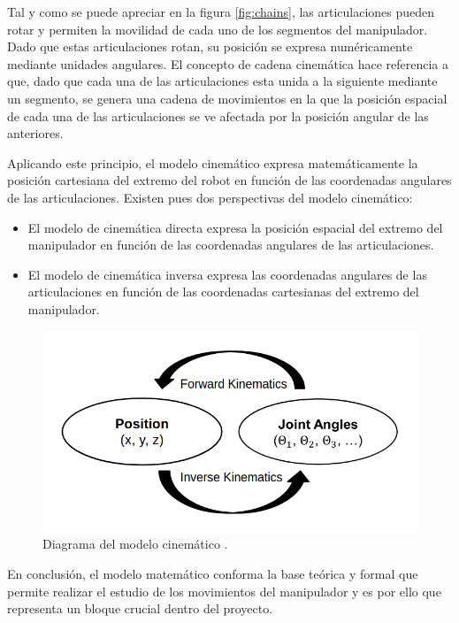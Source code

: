 Tal y como se puede apreciar en la figura \ref{fig:chains}, las articulaciones pueden rotar y permiten la movilidad de cada uno de los segmentos del manipulador. Dado que estas articulaciones rotan, su posición se expresa numéricamente mediante unidades angulares. El concepto de cadena cinemática hace referencia a que, dado que cada una de las articulaciones esta unida a la siguiente mediante un segmento, se genera una cadena de movimientos en la que la posición espacial de cada una de las articulaciones se ve afectada por la posición angular de las anteriores.

Aplicando este principio, el modelo cinemático expresa matemáticamente la posición cartesiana del extremo del robot en función de las coordenadas angulares de las articulaciones. Existen pues dos perspectivas del modelo cinemático:

\begin{itemize}
    \item El modelo de cinemática directa expresa la posición espacial del extremo del manipulador en función de las coordenadas angulares de las articulaciones.
    \item El modelo de cinemática inversa expresa las coordenadas angulares de las articulaciones en función de las coordenadas cartesianas del extremo del manipulador.
\end{itemize}

\begin{figure}[H]
    \centering 
    \includegraphics[width=.6\linewidth]{pictures/Kinematic Diagram.png}
    \caption{Diagrama del modelo cinemático \cite{RoboyInverseKinematics}.}
    \label{fig:kdiagram}
\end{figure}

En conclusión, el modelo matemático conforma la base teórica y formal que permite realizar el estudio de los movimientos del manipulador y es por ello que representa un bloque crucial dentro del proyecto.


